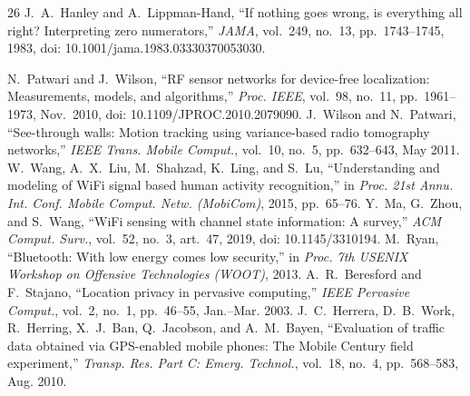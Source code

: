 \documentclass[journal,10pt]{IEEEtran}
\begin{document}
\begin{thebibliography}{26}
 J.~A.~Hanley and A.~Lippman-Hand, ``If nothing
goes wrong, is everything all right? Interpreting zero numerators,''
\emph{JAMA}, vol.~249, no.~13, pp.~1743--1745, 1983, doi:
10.1001/jama.1983.03330370053030.

 N.~Patwari and J.~Wilson, ``RF sensor networks for device-free localization: Measurements, models, and algorithms,'' \emph{Proc. IEEE}, vol.~98, no.~11, pp.~1961--1973, Nov.~2010, doi: 10.1109/JPROC.2010.2079090.
 J.~Wilson and N.~Patwari, ``See-through walls: Motion tracking using variance-based radio tomography networks,'' \emph{IEEE Trans. Mobile Comput.}, vol.~10, no.~5, pp.~632--643, May 2011.
 W.~Wang, A.~X.~Liu, M.~Shahzad, K.~Ling, and S.~Lu, ``Understanding and modeling of WiFi signal based human activity recognition,'' in \emph{Proc. 21st Annu. Int. Conf. Mobile Comput. Netw. (MobiCom)}, 2015, pp.~65--76.
 Y.~Ma, G.~Zhou, and S.~Wang, ``WiFi sensing with channel state information: A survey,'' \emph{ACM Comput. Surv.}, vol.~52, no.~3, art.~47, 2019, doi: 10.1145/3310194.
 M.~Ryan, ``Bluetooth: With low energy comes low security,'' in \emph{Proc. 7th USENIX Workshop on Offensive Technologies (WOOT)}, 2013.
 A.~R.~Beresford and F.~Stajano, ``Location privacy in pervasive computing,'' \emph{IEEE Pervasive Comput.}, vol.~2, no.~1, pp.~46--55, Jan.--Mar. 2003.
 J.~C.~Herrera, D.~B.~Work, R.~Herring, X.~J.~Ban, Q.~Jacobson, and A.~M.~Bayen, ``Evaluation of traffic data obtained via GPS-enabled mobile phones: The Mobile Century field experiment,'' \emph{Transp. Res. Part C: Emerg. Technol.}, vol.~18, no.~4, pp.~568--583, Aug. 2010.
\end{thebibliography}
\end{document}
